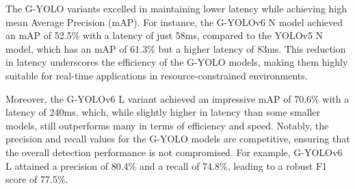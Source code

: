 The G-YOLO variants excelled in maintaining lower latency while achieving high mean Average Precision (mAP). For instance, the G-YOLOv6 N model achieved an mAP of 52.5\% with a latency of just 58ms, compared to the YOLOv5 N model, which has an mAP of 61.3\% but a higher latency of 83ms. This reduction in latency underscores the efficiency of the G-YOLO models, making them highly suitable for real-time applications in resource-constrained environments.

Moreover, the G-YOLOv6 L variant achieved an impressive mAP of 70.6\% with a latency of 240ms, which, while slightly higher in latency than some smaller models, still outperforms many in terms of efficiency and speed. Notably, the precision and recall values for the G-YOLO models are competitive, ensuring that the overall detection performance is not compromised. For example, G-YOLOv6 L attained a precision of 80.4\% and a recall of 74.8\%, leading to a robust F1 score of 77.5\%.

